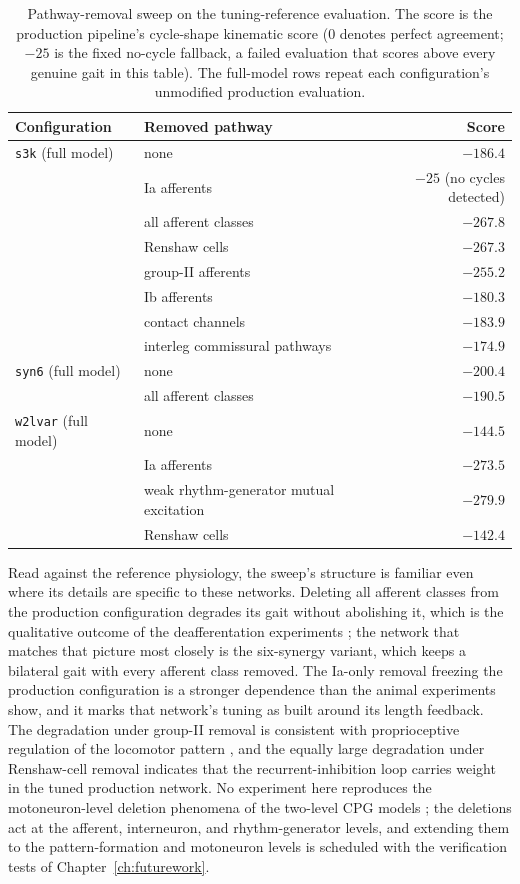 \begin{table}[htbp]
\caption{Pathway-removal sweep on the tuning-reference evaluation. The score is the production pipeline's cycle-shape kinematic score (0 denotes perfect agreement; $-25$ is the fixed no-cycle fallback, a failed evaluation that scores above every genuine gait in this table). The full-model rows repeat each configuration's unmodified production evaluation.}
\label{tab:walker_ablations}
\begin{tabular}{@{}llr@{}}
\toprule
\textbf{Configuration} & \textbf{Removed pathway} & \textbf{Score} \\
\midrule
\texttt{s3k} (full model) & none & $-186.4$ \\
 & Ia afferents & $-25$ (no cycles detected) \\
 & all afferent classes & $-267.8$ \\
 & Renshaw cells & $-267.3$ \\
 & group-II afferents & $-255.2$ \\
 & Ib afferents & $-180.3$ \\
 & contact channels & $-183.9$ \\
 & interleg commissural pathways & $-174.9$ \\
\addlinespace
\texttt{syn6} (full model) & none & $-200.4$ \\
 & all afferent classes & $-190.5$ \\
\addlinespace
\texttt{w2lvar} (full model) & none & $-144.5$ \\
 & Ia afferents & $-273.5$ \\
 & weak rhythm-generator mutual excitation & $-279.9$ \\
 & Renshaw cells & $-142.4$ \\
\bottomrule
\end{tabular}
\end{table}

Read against the reference physiology, the sweep's structure is familiar even where its details are specific to these networks. Deleting all afferent classes from the production configuration degrades its gait without abolishing it, which is the qualitative outcome of the deafferentation experiments \citep{akay_degradation_2014}; the network that matches that picture most closely is the six-synergy variant, which keeps a bilateral gait with every afferent class removed. The Ia-only removal freezing the production configuration is a stronger dependence than the animal experiments show, and it marks that network's tuning as built around its length feedback. The degradation under group-II removal is consistent with proprioceptive regulation of the locomotor pattern \citep{lam_role_2002}, and the equally large degradation under Renshaw-cell removal indicates that the recurrent-inhibition loop carries weight in the tuned production network. No experiment here reproduces the motoneuron-level deletion phenomena of the two-level CPG models \citep{rybak_modelling_2006}; the deletions act at the afferent, interneuron, and rhythm-generator levels, and extending them to the pattern-formation and motoneuron levels is scheduled with the verification tests of Chapter~\ref{ch:futurework}.

